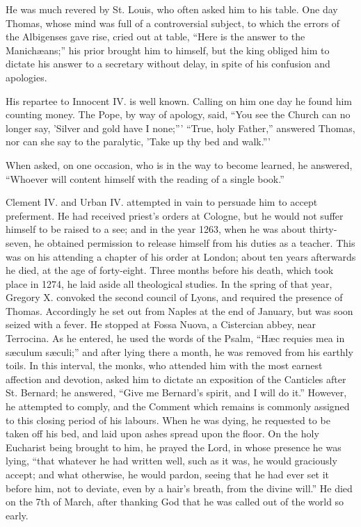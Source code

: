 He was much revered by St. Louis, who often asked
him to his table. One day Thomas, whose mind was full of a controversial
subject, to which the errors of the Albigenses gave rise, cried out at
table, ``Here is the answer to the Manichæans;'' his prior brought him to
himself, but the king obliged him to dictate his answer to a secretary
without delay, in spite of his confusion and apologies.

His repartee to Innocent IV. is well known. Calling
on him one day he found him counting money. The Pope, by way of apology,
said, ``You see the Church can no longer say, 'Silver and gold have I
none;''' ``True, holy Father,'' answered Thomas, nor can she say to the
paralytic, 'Take up thy bed and walk.'''

When asked, on one occasion, who is in the way to
become learned, he answered, ``Whoever will content himself with the
reading of a single book.''

Clement IV. and Urban IV. attempted in vain to
persuade him to accept preferment. He had received priest's orders at
Cologne, but he would not suffer himself to be raised to a see; and in
the year 1263, when he was about thirty-seven, he obtained permission to
release himself from his duties as a teacher. This was on his attending
a chapter of his order at London; about ten years afterwards he died, at
the age of forty-eight. Three months before his death, which took
place in 1274, he laid aside all theological studies. In the spring of
that year, Gregory X. convoked the second council of Lyons, and required
the presence of Thomas. Accordingly he set out from Naples at the end of
January, but was soon seized with a fever. He stopped at Fossa Nuova, a
Cistercian abbey, near Terrocina. As he entered, he used the words of
the Psalm, ``Hæc requies mea in sæculum sæculi;'' and after lying there
a month, he was removed from his earthly toils. In this interval, the
monks, who attended him with the most earnest affection and devotion,
asked him to dictate an exposition of the Canticles after St. Bernard;
he answered, ``Give me Bernard's spirit, and I will do it.'' However, he
attempted to comply, and the Comment which remains is commonly assigned
to this closing period of his labours. When he was dying, he requested
to be taken off his bed, and laid upon ashes spread upon the floor. On
the holy Eucharist being brought to him, he prayed the Lord, in whose
presence he was lying, ``that whatever he had written well, such as it
was, he would graciously accept; and what otherwise, he would pardon,
seeing that he had ever set it before him, not to deviate, even by a
hair's breath, from the divine will.'' He died on the 7th of March, after
thanking God that he was called out of the world so early.

